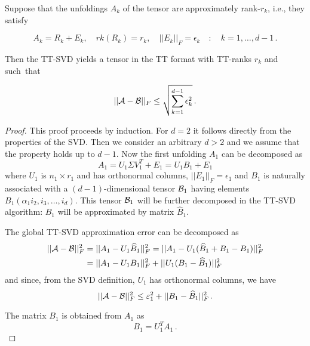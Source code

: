 \begin{Teo} \label{teo:ttsvd_approx}
  Suppose that the unfoldings $A_k$ of the tensor \A are approximately rank-$r_k$, i.e., they satisfy

  \begin{equation} \label{teo:ttsvd_approx:ip:1}
  A_k = R_k + E_k, \quad rk(R_k) = r_k, \quad ||E_k||_F = \epsilon_k \quad:\quad k = 1,\ldots,d-1\, .
  \end{equation}

  Then the TT-SVD yields a tensor \B in the TT format with TT-ranks $r_k$ and such~that

  \begin{equation*}
    ||\mathcal{A} - \mathcal{B} ||_F \le \sqrt{\sum_{k=1}^{d-1} \epsilon_k^2}\, .
  \end{equation*}
  
  \begin{proof}
    This proof proceeds by induction. For $d=2$ it follows directly from the properties of the SVD. Then we consider an arbitrary $d > 2$ and we assume that the property holds up to $d - 1$.  Now the first unfolding $A_1$ can be decomposed as
    \begin{equation*}
    A_1 = U_1 \Sigma V_1^T + E_1 = U_1 B_1 + E_1
    \end{equation*}
    where $U_1$ is $n_1 \times r_1$ and has orthonormal columns, $||E_1||_F = \epsilon_1$ and $B_1$ is naturally associated with a $(d-1)$-dimensional tensor $\mathcal{B}_1$ having elements $B_1(\alpha_1i_2,i_3,\ldots,i_d)$. This tensor $\mathcal{B}_1$ will be further decomposed in the TT-SVD algorithm: $B_1$ will be approximated by matrix $\hat{B}_1$.

    The global TT-SVD approximation error can be decomposed as
    \begin{equation*}
      \begin{split}
        ||\mathcal{A}-\mathcal{B}||_F^2 &= ||A_1 - U_1\widehat{B}_1||_F^2 = ||A_1 - U_1(\widehat{B}_1 + B_1 - B_1)||_F^2 \\
         &= ||A_1 - U_1 B_1||_F^2 + ||U_1(B_1 - \widehat{B}_1)||_F^2
      \end{split}
    \end{equation*}
    and since, from the SVD definition, $U_1$ has orthonormal columns, we have
    \begin{equation} \label{teo:ttsvd_approx:proof:bound}
      ||\mathcal{A} - \mathcal{B}||_F^2 \le \varepsilon_1^2 + ||B_1 - \widehat{B}_1 ||_F^2\, .
    \end{equation}

    The matrix $B_1$ is obtained from $A_1$ as
    \begin{equation*}
      B_1 = U_1^T A_1\, .
    \end{equation*}


\end{proof}
\end{Teo}
